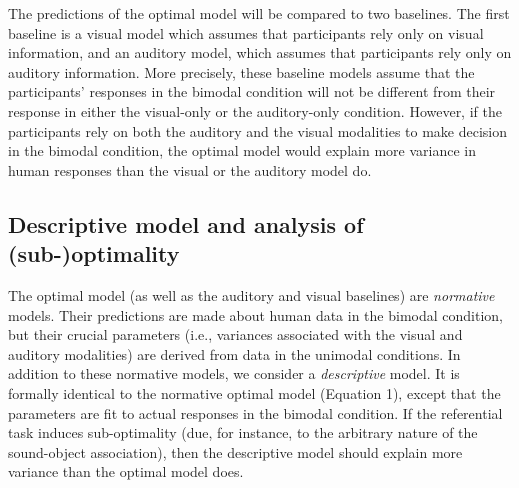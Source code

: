 \documentclass[english,,man,floatsintext]{apa6}
\theoremstyle{definition}
\theoremstyle{definition}
\theoremstyle{definition}
\theoremstyle{remark}
\begin{document}
The predictions of the optimal model will be compared to two baselines.
The first baseline is a visual model which assumes that participants
rely only on visual information, and an auditory model, which assumes
that participants rely only on auditory information. More precisely,
these baseline models assume that the participants' responses in the
bimodal condition will not be different from their response in either
the visual-only or the auditory-only condition. However, if the
participants rely on both the auditory and the visual modalities to make
decision in the bimodal condition, the optimal model would explain more
variance in human responses than the visual or the auditory model do.

\subsection{Descriptive model and analysis of
(sub-)optimality}\label{descriptive-model-and-analysis-of-sub-optimality}

The optimal model (as well as the auditory and visual baselines) are
\emph{normative} models. Their predictions are made about human data in
the bimodal condition, but their crucial parameters (i.e., variances
associated with the visual and auditory modalities) are derived from
data in the unimodal conditions. In addition to these normative models,
we consider a \emph{descriptive} model. It is formally identical to the
normative optimal model (Equation 1), except that the parameters are fit
to actual responses in the bimodal condition. If the referential task
induces sub-optimality (due, for instance, to the arbitrary nature of
the sound-object association), then the descriptive model should explain
more variance than the optimal model does.
\end{document}
